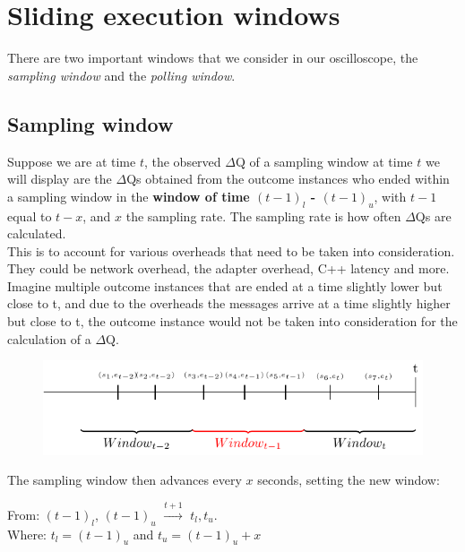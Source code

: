 \section{Sliding execution windows}

    There are two important windows that we consider in our oscilloscope, the \textit{sampling window} and the \textit{polling window}.

    \subsection{Sampling window}
    Suppose we are at time $t$, the observed $\Delta$Q of a sampling window at time $t$ we will display are the $\Delta$Qs obtained from the outcome instances who ended within a sampling window in the \textbf{window of time $(t-1)_{l}$ - $(t-1)_u$}, with $t-1$ equal to $t - x$, and $x$ the sampling rate. The sampling rate is how often $\Delta$Qs are calculated. \\
    This is to account for various overheads that need to be taken into consideration. They could be network overhead, the adapter overhead, C++ latency and more. Imagine multiple outcome instances that are ended at a time slightly lower but close to t, and due to the overheads the messages arrive at a time slightly higher but close to t, the outcome instance would not be taken into consideration for the calculation of a $\Delta$Q.
    
    \begin{figure}[H]
        \begin{center}
            \includegraphics[scale = 0.8]{tikz/window.pdf}
        \end{center}
    \end{figure}
    
    The sampling window then advances every $x$ seconds, setting the new window: 
    \begin{center}
        From: $(t-1)_l$, $(t-1)_u$ $\xrightarrow{t + 1}$ $t_l, t_u$. \\
        Where: $t_l = (t-1)_u$ and $t_u = (t-1)_u + x$ 
    \end{center}
    
